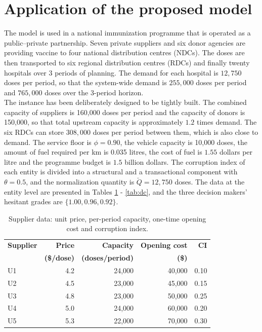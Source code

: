 \documentclass[a4paper]{elsarticle}
\begin{document}
{\section{Application of the proposed model}
\label{s7}
The model is used in a national immunization programme that is operated as a public--private partnership. Seven private suppliers and six donor agencies are providing vaccine to four national distribution centres (NDCs). The doses are then transported to six regional distribution centres (RDCs) and finally twenty hospitals over $3$ periods of planning. The demand for each hospital is $12,750$ doses per period, so that the system-wide demand is $255,000$ doses per period and $765,000$ doses over the 3-period horizon.\\
The instance has been deliberately designed to be tightly built. The combined capacity of suppliers is 160,000 doses per period and the capacity of donors is 150,000, so that total upstream capacity is approximately $1.2$ times demand. The six RDCs can store $308,000$ doses per period between them, which is also close to demand. The service floor is $\phi = 0.90$, the vehicle capacity is 10,000 doses, the amount of fuel required per km is 0.035 litres, the cost of fuel is $1.55$ dollars per litre and the programme budget is $1.5$ billion dollars. The corruption index of each entity is divided into a structural and a transactional component with $\theta = 0.5$, and the normalization quantity is $\breve{Q} = 12,750$ doses. The data at the entity level are presented in Tables \ref{tab:supplier} - \ref{tab:dc}, and the three decision makers' hesitant grades are $\{1.00, 0.96, 0.92\}$.
\begin{table}[h!]
\centering
\caption{Supplier data: unit price, per-period capacity, one-time opening cost and corruption index.}
\label{tab:supplier}
\begin{tabular}{@{}lrrrr@{}}
\toprule
\textbf{Supplier} & \textbf{Price} & \textbf{Capacity} & \textbf{Opening cost} & \textbf{CI} \\
 & \textbf{(\$/dose)} & \textbf{(doses/period)} & \textbf{(\$)} & \\
\midrule
U1 & 4.2 & 24{,}000 & 40{,}000 & 0.10 \\
U2 & 4.5 & 23{,}000 & 45{,}000 & 0.15 \\
U3 & 4.8 & 23{,}000 & 50{,}000 & 0.25 \\
U4 & 5.0 & 24{,}000 & 60{,}000 & 0.20 \\
U5 & 5.3 & 22{,}000 & 70{,}000 & 0.30 \\

\end{tabular}
\end{table}}
\end{document}
